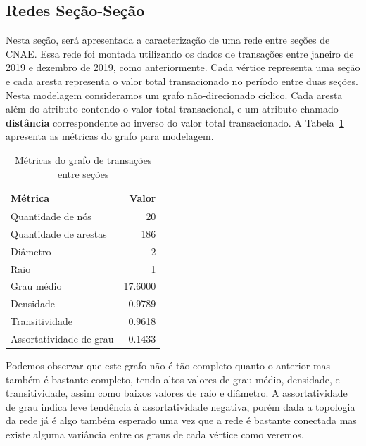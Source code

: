 \subsection{Redes Seção-Seção}
\label{section:metricas-redes:secao}

Nesta seção, será apresentada a caracterização de uma rede entre seções de CNAE. Essa rede foi montada utilizando os dados de transações entre janeiro de 2019 e dezembro de 2019, como anteriormente. Cada vértice representa uma seção e cada aresta representa o valor total transacionado no período entre duas seções. Nesta modelagem consideramos um grafo não-direcionado cíclico. Cada aresta além do atributo contendo o valor total transacional, e um atributo chamado \textbf{distância} correspondente ao inverso do valor total transacionado. A Tabela~\ref{tab:metricas-redes:grafo-por-secao} apresenta as métricas do grafo para modelagem.

\begin{table}[htb]
\centering
\caption{Métricas do grafo de transações entre seções}
\label{tab:metricas-redes:grafo-por-secao}
    \begin{tabular}{l|r}
    \toprule
    Métrica &  Valor \\
    \midrule
    Quantidade de nós       &   20      \\
    Quantidade de arestas   &  186      \\
    Diâmetro                &    2      \\
    Raio                    &    1      \\
    Grau médio              &   17.6000 \\
    Densidade               &    0.9789 \\
    Transitividade          &    0.9618 \\
    Assortatividade de grau &   -0.1433 \\
    \bottomrule
    \end{tabular}
\fdadospesquisa
\end{table}

Podemos observar que este grafo não é tão completo quanto o anterior mas também é bastante completo, tendo altos valores de grau médio, densidade, e transitividade, assim como baixos valores de raio e diâmetro. A assortatividade de grau indica leve tendência à assortatividade negativa, porém dada a topologia da rede já é algo também esperado uma vez que a rede é bastante conectada mas existe alguma variância entre os graus de cada vértice como veremos.

